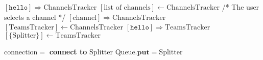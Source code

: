 \documentclass{article}
\begin{document}
\pagestyle{empty}

\newcommand{\send}{\Rightarrow}
\newcommand{\sendto}{\rightarrow}
\algrenewcommand{}
\algrenewcommand\textproc{\textrm}

\begin{algorithmic}
  \State $[\mathtt{hello}] \send \mathrm{ChannelsTracker}$
  \State $[\text{list of channels}] \gets \mathrm{ChannelsTracker}$
  \State /* The user selects a channel */
  \State $[\mathrm{channel}] \send \mathrm{ChannelsTracker}$
  \State $[\mathrm{TeamsTracker}] \gets \mathrm{ChannelsTracker}$
  \State $[\mathtt{hello}] \send \mathrm{TeamsTracker}$
  \State $[\{\mathrm{Splitter}\}] \gets \mathrm{TeamsTracker}$
  \EndFor 
  \EndFunction
\end{algorithmic}

\algrenewcommand{}

\begin{algorithmic}
  \State $\mathrm{connection} =$ \textbf{connect to} $\mathrm{Splitter}$
  \State $\mathrm{Queue}.\mathbf{put}=\mathrm{Splitter}$
  \EndIf
  \EndFunction
\end{algorithmic}
\end{document}
